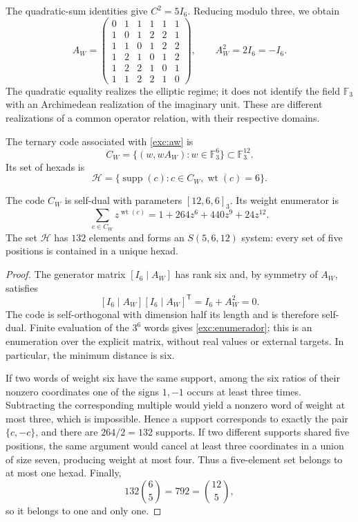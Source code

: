 The quadratic-sum identities give $C^2=5I_6$. Reducing modulo
three, we obtain
\begin{equation}
 A_W=
 \begin{pmatrix}
 0&1&1&1&1&1\\
 1&0&1&2&2&1\\
 1&1&0&1&2&2\\
 1&2&1&0&1&2\\
 1&2&2&1&0&1\\
 1&1&2&2&1&0
 \end{pmatrix},
 \qquad A_W^2=2I_6=-I_6.
 \label{exc:aw}
\end{equation}
The quadratic equality realizes the elliptic regime; it does not identify the
field $\mathbb F_3$ with an Archimedean realization of the imaginary
unit. These are different realizations of a common operator
relation, with their respective domains.

\begin{definition}
\label{exc:codigo}
The ternary code associated with \eqref{exc:aw} is
\[
 C_W=\{(w,wA_W):w\in\mathbb F_3^6\}
       \subset\mathbb F_3^{12}.
\]
Its set of hexads is
\[
 \mathcal H=
 \{\operatorname{supp}(c):c\in C_W,
                           \operatorname{wt}(c)=6\}.
\]
\end{definition}

\begin{proposition}
\label{exc:codigo-witt}
The code $C_W$ is self-dual with parameters $[12,6,6]_3$. Its weight
enumerator is
\begin{equation}
 \sum_{c\in C_W}z^{\operatorname{wt}(c)}
   =1+264z^6+440z^9+24z^{12}.
 \label{exc:enumerador}
\end{equation}
The set $\mathcal H$ has $132$ elements and forms an
$S(5,6,12)$ system: every set of five positions is contained in a
unique hexad.
\end{proposition}

\begin{proof}
The generator matrix $[I_6\mid A_W]$ has rank six and, by symmetry
of $A_W$, satisfies
\[
 [I_6\mid A_W][I_6\mid A_W]^{\mathsf T}
   =I_6+A_W^2=0.
\]
The code is self-orthogonal with dimension half its length and is
therefore self-dual. Finite evaluation of the $3^6$ words gives
\eqref{exc:enumerador}; this is an enumeration over the explicit matrix,
without real values or external targets. In particular, the minimum
distance is six.

If two words of weight six have the same support, among the six
ratios of their nonzero coordinates one of the signs $1,-1$ occurs at
least three times. Subtracting the corresponding multiple would yield
a nonzero word of weight at most three, which is impossible. Hence a support
corresponds to exactly the pair $\{c,-c\}$, and there are $264/2=132$
supports. If two different supports shared five positions,
the same argument would cancel at least three coordinates in a union
of size seven, producing weight at most four. Thus a
five-element set belongs to at most one hexad. Finally,
\[
 132\binom65=792=\binom{12}5,
\]
so it belongs to one and only one.
\end{proof}

